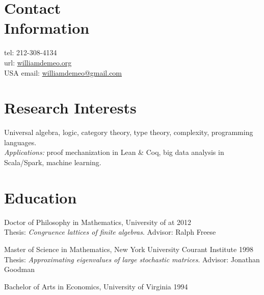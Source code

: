 \documentclass[margin,line]{resume}
\begin{document}
\begin{resume}

    \section{\mysidestyle Contact\\Information}
     \streetaddress   \hfill tel: 212-308-4134\\
     \citystatezip       \hfill url: \href{http://williamdemeo.org}{williamdemeo.org}\\
     {\small USA}             \hfill email: \href{mailto:williamdemeo@gmail.com}{williamdemeo@gmail.com}

     \vspace{-1mm}
     \section{\mysidestyle Research Interests}

     Universal algebra, logic, category theory, type theory, complexity, programming languages.\\[3pt] 
     {\it Applications:} proof mechanization in Lean \& Coq, big data analysis in Scala/Spark, machine learning.
        

    \vspace{-1mm}
    \section{\mysidestyle Education}

    Doctor of Philosophy in Mathematics, University of \Hawaii at \Manoa \hfill 2012\\    
     Thesis: \textsl{Congruence lattices of finite algebras}. Advisor:  Ralph Freese

    \vspace{-2mm}
    Master of Science in Mathematics, New York University Courant Institute \hfill 1998\\
    Thesis: \textsl{Approximating eigenvalues of large stochastic matrices}. Advisor:  Jonathan Goodman

    \vspace{-2mm}
    Bachelor of Arts in Economics, University of Virginia \hfill 1994


\end{resume}
\end{document}
